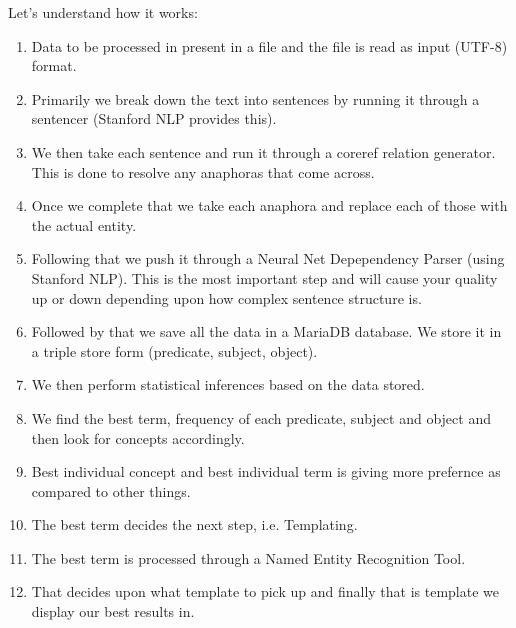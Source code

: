\documentclass[conference]{IEEEtran}
\begin{document}
Let's understand how it works:
\begin{enumerate}
\item Data to be processed in present in a file and the file is read as input (UTF-8) format.
\item Primarily we break down the text into sentences by running it through a sentencer (Stanford NLP provides this).
\item We then take each sentence and run it through a coreref relation generator. This is done to resolve any anaphoras that come across.
\item Once we complete that we take each anaphora and replace each of those with the actual entity.
\item Following that we push it through a Neural Net Depependency Parser (using Stanford NLP). This is the most important step and will cause your quality up or down depending upon how complex sentence structure is.
\item Followed by that we save all the data in a MariaDB database. We store it in a triple store form (predicate, subject, object).
\item We then perform statistical inferences based on the data stored.
\item We find the best term, frequency of each predicate, subject and object and then look for concepts accordingly.
\item Best individual concept and best individual term is giving more prefernce as compared to other things.
\item The best term decides the next step, i.e. Templating.
\item The best term is processed through a Named Entity Recognition Tool.
\item That decides upon what template to pick up and finally that is template we display our best results in.
\end{enumerate}
\end{document}
